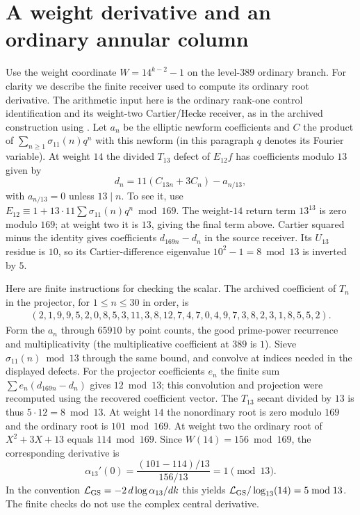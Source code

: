 \documentclass[11pt]{article}
\begin{document}
\section{A weight derivative and an ordinary annular column}
Use the weight coordinate $W=14^{k-2}-1$ on the level-$389$
ordinary branch. For clarity we describe the finite receiver used
to compute its ordinary root derivative. The arithmetic input here
is the ordinary rank-one control identification and its weight-two
Cartier/Hecke receiver, as in the archived construction using
\cite[\S\S3.3, 3.8]{EPW}. Let $a_n$ be the elliptic newform coefficients
and $C$ the product of $\sum_{n\ge1}\sigma_{11}(n)q^n$ with this newform
(in this paragraph $q$ denotes its Fourier variable).
At weight $14$ the divided $T_{13}$ defect of $E_{12}f$ has
coefficients modulo $13$ given by
\[
 d_n=11(C_{13n}+3C_n)-a_{n/13},
\]
with $a_{n/13}=0$ unless $13\mid n$. To see it, use
$E_{12}\equiv1+13\cdot11\sum\sigma_{11}(n)q^n\bmod169$.
The weight-$14$ return term $13^{13}$ is zero modulo $169$; at
weight two it is $13$, giving the final term above. Cartier squared
minus the identity gives coefficients $d_{169n}-d_n$ in the
source receiver. Its $U_{13}$ residue is $10$, so its
Cartier-difference eigenvalue $10^2-1=8\bmod13$ is inverted by $5$.

Here are finite instructions for checking the scalar. The archived
coefficient of $T_n$ in the projector, for $1\le n\le30$ in order,
is
\[
\begin{gathered}
 (2,1,9,9,5,2,0,8,5,3,11,3,8,12,7,4,7,0,4,9,7,3,8,2,3,1,8,5,5,2).
\end{gathered}
\]
Form the $a_n$ through $65910$ by point counts, the good prime-power
recurrence and multiplicativity (the multiplicative coefficient at
$389$ is $1$). Sieve $\sigma_{11}(n)\bmod13$ through the same bound,
and convolve at indices needed in the displayed defects. For the
projector coefficients $e_n$ the finite sum
$\sum e_n(d_{169n}-d_n)$ gives $12\bmod13$; this convolution and
projection were recomputed using the recovered coefficient vector.
The $T_{13}$ secant divided by $13$ is thus $5\cdot12=8\bmod13$.
At weight $14$ the nonordinary root is zero modulo $169$ and the
ordinary root is $101\bmod169$. At weight two the ordinary root of
$X^2+3X+13$ equals $114\bmod169$. Since $W(14)=156\bmod169$,
the corresponding derivative is
\[
 \alpha_{13}'(0)=
 \frac{(101-114)/13}{156/13}=1\pmod{13}.
\]
In the convention $\mathcal L_{\rm GS}=-2\,d\log\alpha_{13}/dk$
this yields $\mathcal L_{\rm GS}/\log_{13}(14)=5\bmod13$.
The finite checks do not use the complex central derivative.
\end{document}
